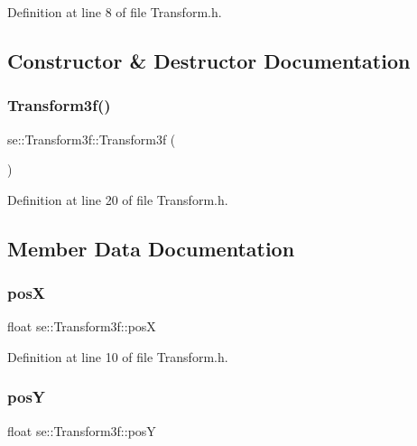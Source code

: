 Definition at line 8 of file Transform.\+h.



\subsection{Constructor \& Destructor Documentation}
\mbox{\label{classse_1_1_transform3f_ad3b4895905ce0ca7e62fdf41044b7afb}} 
\subsubsection{\texorpdfstring{Transform3f()}{Transform3f()}}
{\footnotesize\ttfamily se\+::\+Transform3f\+::\+Transform3f (\begin{DoxyParamCaption}{ }\end{DoxyParamCaption})\hspace{0.3cm}{\ttfamily [inline]}}



Definition at line 20 of file Transform.\+h.



\subsection{Member Data Documentation}
\mbox{\label{classse_1_1_transform3f_ad2c0078eef5e4b87361f764ad9ac4f84}} 
\subsubsection{\texorpdfstring{posX}{posX}}
{\footnotesize\ttfamily float se\+::\+Transform3f\+::posX}



Definition at line 10 of file Transform.\+h.

\mbox{\label{classse_1_1_transform3f_a3bc9b7dab3224ff12df803c157b86d3d}} 
\subsubsection{\texorpdfstring{posY}{posY}}
{\footnotesize\ttfamily float se\+::\+Transform3f\+::posY}



